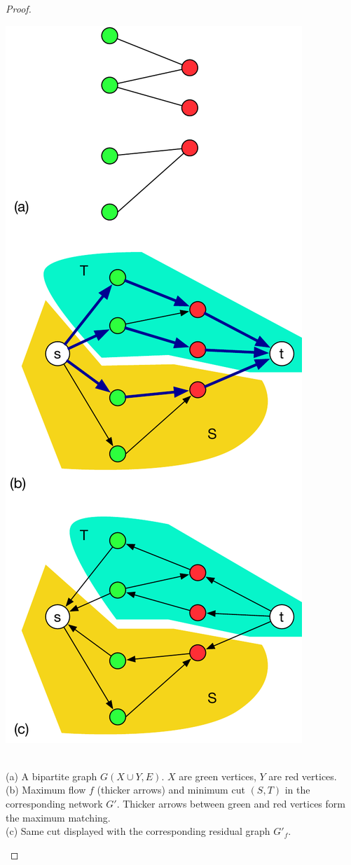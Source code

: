 \begin{proof}
\begin{marginfigure}[0.1in]
\includegraphics[scale=0.5]{koenig.pdf}
\caption{\\
             (a) A bipartite graph $G(X \cup Y, E)$. $X$ are green vertices, $Y$ are red vertices.\\
             (b) Maximum flow $f$ (thicker arrows) and minimum cut $(S, T)$ in the corresponding network $G'$. Thicker arrows between green and red vertices form the maximum matching.\\
             (c) Same cut displayed with the corresponding residual graph $G'_f$.}
	\label{koenig_example}
\end{marginfigure}


\end{proof}
